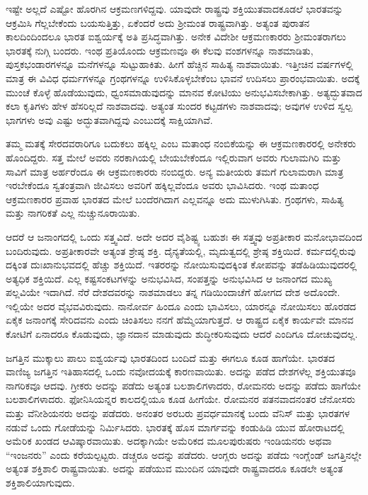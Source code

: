 ಇಷ್ಟೇ ಅಲ್ಲದೆ ಎಷ್ಟೋ ಹೊರಗಿನ ಆಕ್ರಮಣಗಳಿದ್ದವು. ಯಾವುದೇ ರಾಷ್ಟ್ರವು ಶಕ್ತಿಯುತವಾದಕೂಡಲೆ ಭಾರತವನ್ನು ಆಕ್ರಮಿಸಿ ಗೆಲ್ಲಬೇಕೆಂದು ಬಯಸುತ್ತಿತ್ತು, ಏಕೆಂದರೆ ಅದು ಶ‍್ರೀಮಂತ ರಾಷ್ಟ್ರವಾಗಿತ್ತು. ಅತ್ಯಂತ ಪುರಾತನ ಕಾಲದಿಂದಿಂದಲೂ ಭಾರತ ಐಶ್ವರ್ಯಕ್ಕೆ ಅತಿ ಪ್ರಸಿದ್ಧವಾಗಿತ್ತು. ಅನೇಕ ವಿದೇಶೀ ಆಕ್ರಮಣಕಾರರು ಶ‍್ರೀಮಂತರಾಗಲು ಭಾರತಕ್ಕೆ ನುಗ್ಗಿ ಬಂದರು. ಇಂಥ ಪ್ರತಿಯೊಂದು ಆಕ್ರಮಣವೂ ಈ ಕೆಲವು ವಂಶಗಳನ್ನೂ ನಾಶಮಾಡಿತು, ಪುಸ್ತಕಭಂಡಾರಗಳನ್ನೂ ಮನೆಗಳನ್ನೂ ಸುಟ್ಟುಹಾಕಿತು. ಹೀಗೆ ಹೆಚ್ಚಿನ ಸಾಹಿತ್ಯ ನಾಶವಾಯಿತು. ಇತ್ತೀಚಿನ ವರ್ಷಗಳಲ್ಲಿ ಮಾತ್ರ ಈ ವಿವಿಧ ಧರ್ಮಗಳನ್ನೂ ಗ್ರಂಥಗಳನ್ನೂ ಉಳಿಸಿಕೊಳ್ಳಬೇಕೆಂಬ ಭಾವನೆ ಉದಿಸಲು ಪ್ರಾರಂಭವಾಯಿತು. ಅದಕ್ಕೆ ಮುಂಚೆ ಕೊಳ್ಳೆ ಹೊಡೆಯುವುದು, ಧ್ವಂಸಮಾಡುವುದನ್ನು ಮಾನವ ಕೋಟಿಯು ಅನುಭವಿಸಬೇಕಾಗಿತ್ತು. ಅತ್ಯದ್ಭುತವಾದ ಕಲಾ ಕೃತಿಗಳು ಹೇಳ ಹೆಸರಿಲ್ಲದೆ ನಾಶವಾದವು. ಅತ್ಯಂತ ಸುಂದರ ಕಟ್ಟಡಗಳು ನಾಶವಾದವು; ಅವುಗಳ ಉಳಿದ ಸ್ವಲ್ಪ ಭಾಗಗಳು ಅವು ಎಷ್ಟು ಅದ್ಭುತವಾಗಿದ್ದವು ಎಂಬುದಕ್ಕೆ ಸಾಕ್ಷಿಯಾಗಿವೆ.

ತಮ್ಮ ಮತಕ್ಕೆ ಸೇರದವರಾರಿಗೂ ಬದುಕಲು ಹಕ್ಕಿಲ್ಲ ಎಂಬ ಮತಾಂಧ ನಂಬಿಕೆಯನ್ನು ಈ ಆಕ್ರಮಣಕಾರರಲ್ಲಿ ಅನೇಕರು ಹೊಂದಿದ್ದರು. ಸತ್ತ ಮೇಲೆ ಅವರು ನರಕಾಗಿಯಲ್ಲಿ ಬೇಯಬೇಕೆಂದೂ ಇಲ್ಲಿರುವಾಗ ಅವರು ಗುಲಾಮಗಿರಿ ಮತ್ತು ಸಾವಿಗೆ ಮಾತ್ರ ಅರ್ಹರೆಂದೂ ಈ ಆಕ್ರಮಣಕಾರರು ನಂಬಿದ್ದರು. ಅನ್ಯ ಮತೀಯರು ತಮಗೆ ಗುಲಾಮರಾಗಿ ಮಾತ್ರ ಇರಬೇಕೆಂದೂ ಸ್ವತಂತ್ರವಾಗಿ ಜೀವಿಸಲು ಅವರಿಗೆ ಹಕ್ಕಿಲ್ಲವೆಂದೂ ಅವರು ಭಾವಿಸಿದರು. ಇಂಥ ಮತಾಂಧ ಆಕ್ರಮಣಕಾರರ ಪ್ರವಾಹ ಭಾರತದ ಮೇಲೆ ಬಂದೆರಗಿದಾಗ ಎಲ್ಲವನ್ನೂ ಅದು ಮುಳುಗಿಸಿತು. ಗ್ರಂಥಗಳು, ಸಾಹಿತ್ಯ ಮತ್ತು ನಾಗರಿಕತೆ ಎಲ್ಲ ನುಚ್ಚುನೂರಾಯಿತು.

ಆದರೆ ಆ ಜನಾಂಗದಲ್ಲಿ ಒಂದು ಸತ್ತ್ವವಿದೆ. ಅದೇ ಅದರ ವೈಶಿಷ್ಟ್ಯ ಬಹುಶಃ ಈ ಸತ್ತ್ವವು ಅಪ್ರತೀಕಾರ ಮನೋಭಾವದಿಂದ ಬಂದಿರುವುದು. ಅಪ್ರತೀಕಾರವೇ ಅತ್ಯಂತ ಶ್ರೇಷ್ಠ ಶಕ್ತಿ. ದೈನ್ಯತೆಯಲ್ಲಿ, ಮೃದುತ್ವದಲ್ಲಿ ಶ್ರೇಷ್ಠ ಶಕ್ತಿಯಿದೆ. ಕರ್ಮದಲ್ಲಿರುವು ದಕ್ಕಿಂತ ದುಃಖಾನುಭವದಲ್ಲಿ ಹೆಚ್ಚು ಶಕ್ತಿಯಿದೆ. ಇತರರನ್ನು ನೋಯಿಸುವುದಕ್ಕಿಂತ ಕೋಪವನ್ನು ತಡೆಹಿಡಿಯುವುದರಲ್ಲಿ ಅತ್ಯಧಿಕ ಶಕ್ತಿಯಿದೆ. ಎಲ್ಲ ಕಷ್ಟಸಂಕಟಗಳನ್ನು ಅನುಭವಿಸಿದ, ಸಂಪತ್ತನ್ನು ಅನುಭವಿಸಿದ ಆ ಜನಾಂಗದ ಮುಖ್ಯ ಪಲ್ಲವಿಯೇ ಇದಾಗಿದೆ. ನೆರೆ ದೇಶದವರನ್ನು ನಾಶಮಾಡಲು ತನ್ನ ಗಡಿಯಿಂದಾಚೆಗೆ ಹೋಗದ ದೇಶ ಅದೊಂದೇ. ಇಲ್ಲಿಯೇ ಅದರ ವೈಭವವಿರುವುದು. ನಾನೋರ್ವ ಹಿಂದೂ ಎಂದು ಭಾವಿಸಲು, ಯಾರನ್ನೂ ನೋಯಿಸಲು ಹೊರಡದ ಏಕೈಕ ಜನಾಂಗಕ್ಕೆ ಸೇರಿದವನು ಎಂದು ಚಿಂತಿಸಲು ನನಗೆ ಹೆಮ್ಮೆಯಾಗುತ್ತದೆ. ಆ ರಾಷ್ಟ್ರದ ಏಕೈಕ ಕಾರ್ಯವೇ ಮಾನವ ಕೋಟಿಗೆ ಏನಾದರೂ ಕೊಡುವುದು, ಜ್ಞಾನದಾನ ಮಾಡುವುದು ಶುದ್ಧೀಕರಿಸುವುದು ಆದರೆ ಎಂದಿಗೂ ದೋಚುವುದಲ್ಲ.

ಜಗತ್ತಿನ ಮುಕ್ಕಾಲು ಪಾಲು ಐಶ್ವರ್ಯವು ಭಾರತದಿಂದ ಬಂದಿದೆ ಮತ್ತು ಈಗಲೂ ಕೂಡ ಹಾಗೆಯೇ. ಭಾರತದ ವಾಣಿಜ್ಯ ಜಗತ್ತಿನ ಇತಿಹಾಸದಲ್ಲಿ ಒಂದು ನವೋದಯಕ್ಕೆ ಕಾರಣವಾಯಿತು. ಅದನ್ನು ಪಡೆದ ದೇಶಗಳೆಲ್ಲ ಶಕ್ತಿಯುತವೂ ನಾಗರಿಕವೂ ಆದವು. ಗ್ರೀಕರು ಅದನ್ನು ಪಡೆದು ಅತ್ಯಂತ ಬಲಶಾಲಿಗಳಾದರು, ರೋಮನರು ಅದನ್ನು ಪಡೆದು ಹಾಗೆಯೇ ಬಲಶಾಲಿಗಳಾದರು. ಫೋನಿಸಿಯನ್ನರ ಕಾಲದಲ್ಲಿಯೂ ಕೂಡ ಹೀಗೆಯೇ. ರೋಮನರ ಪತನವಾದನಂತರ ಜೆನೋಸರು ಮತ್ತು ವೆನೀಶಿಯನರು ಅದನ್ನು ಪಡೆದರು. ಅನಂತರ ಅರಬರು ಪ್ರವರ್ಧಮಾನಕ್ಕೆ ಬಂದು ವೆನಿಸ್ ಮತ್ತು ಭಾರತಗಳ ನಡುವೆ ಒಂದು ಗೋಡೆಯನ್ನು ನಿರ್ಮಿಸಿದರು. ಭಾರತಕ್ಕೆ ಹೊಸ ಮಾರ್ಗವನ್ನು ಕಂಡುಹಿಡಿ ಯುವ ಹೋರಾಟದಲ್ಲಿ ಅಮೆರಿಕ ಖಂಡದ ಆವಿಷ್ಕಾರವಾಯಿತು. ಅದಕ್ಕಾಗಿಯೇ ಅಮೆರಿಕದ ಮೂಲಪುರುಷರು ಇಂಡಿಯನರು ಅಥವಾ “ಇಂಜನರು” ಎಂದು ಕರೆಯಲ್ಪಟ್ಟರು. ಡಚ್ಚರೂ ಅದನ್ನು ಪಡೆದರು. ಆಂಗ್ಲರು ಅದನ್ನು ಪಡೆದು ಇಂಗ್ಲೆಂಡ್ ಜಗತ್ತಿನಲ್ಲೇ ಅತ್ಯಂತ ಶಕ್ತಿಶಾಲಿ ರಾಷ್ಟ್ರವಾಯಿತು. ಅದನ್ನು ಪಡೆಯುವ ಮುಂದಿನ ಯಾವುದೇ ರಾಷ್ಟ್ರವಾದರೂ ಕೂಡಲೇ ಅತ್ಯಂತ ಶಕ್ತಿಶಾಲಿಯಾಗುವುದು.

